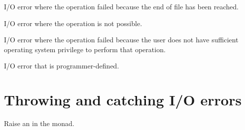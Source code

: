 \begin{haddockdesc}
\item[\begin{tabular}{@{}l}
eofErrorType :: IOErrorType
\end{tabular}]
{\haddockbegindoc
I/O error where the operation failed because the end of file has
 been reached.\par}
\end{haddockdesc}
\begin{haddockdesc}
\item[\begin{tabular}{@{}l}
illegalOperationErrorType :: IOErrorType
\end{tabular}]
{\haddockbegindoc
I/O error where the operation is not possible.\par}
\end{haddockdesc}
\begin{haddockdesc}
\item[\begin{tabular}{@{}l}
permissionErrorType :: IOErrorType
\end{tabular}]
{\haddockbegindoc
I/O error where the operation failed because the user does not
 have sufficient operating system privilege to perform that operation.\par}
\end{haddockdesc}
\begin{haddockdesc}
\item[\begin{tabular}{@{}l}
userErrorType :: IOErrorType
\end{tabular}]
{\haddockbegindoc
I/O error that is programmer-defined.\par}
\end{haddockdesc}
\section{Throwing and catching I/O errors}
\begin{haddockdesc}
\item[\begin{tabular}{@{}l}
ioError :: IOError -> IO a
\end{tabular}]
{\haddockbegindoc
Raise an  in the  monad.\par}
\end{haddockdesc}